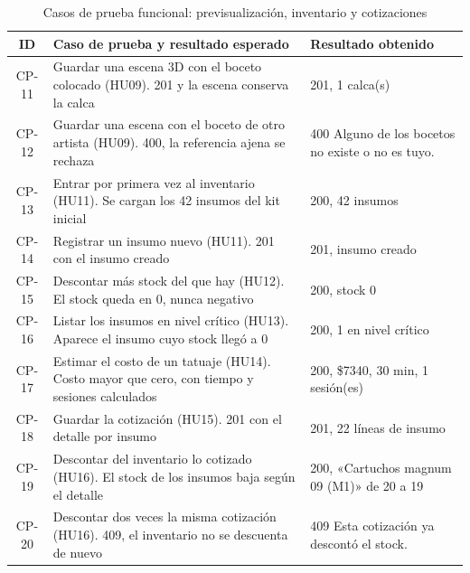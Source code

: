 \documentclass[12pt,letterpaper,oneside]{report}
\begin{document}
\begin{table}[H]
  \centering
  \caption{Casos de prueba funcional: previsualización, inventario y cotizaciones}
  \label{tab:casosinv}
  \renewcommand{\arraystretch}{1.2}
  \footnotesize
  \begin{tabular}{|c|p{5.9cm}|p{5.3cm}|}
    \hline
    \textbf{ID} & \textbf{Caso de prueba y resultado esperado} & \textbf{Resultado obtenido} \\
    \hline
    CP-11 & Guardar una escena 3D con el boceto colocado (HU09). 201 y la escena conserva la calca & 201, 1 calca(s) \\ \hline
    CP-12 & Guardar una escena con el boceto de otro artista (HU09). 400, la referencia ajena se rechaza & 400 Alguno de los bocetos no existe o no es tuyo. \\ \hline
    CP-13 & Entrar por primera vez al inventario (HU11). Se cargan los 42 insumos del kit inicial & 200, 42 insumos \\ \hline
    CP-14 & Registrar un insumo nuevo (HU11). 201 con el insumo creado & 201, insumo creado \\ \hline
    CP-15 & Descontar más stock del que hay (HU12). El stock queda en 0, nunca negativo & 200, stock 0 \\ \hline
    CP-16 & Listar los insumos en nivel crítico (HU13). Aparece el insumo cuyo stock llegó a 0 & 200, 1 en nivel crítico \\ \hline
    CP-17 & Estimar el costo de un tatuaje (HU14). Costo mayor que cero, con tiempo y sesiones calculados & 200, \$7340, 30 min, 1 sesión(es) \\ \hline
    CP-18 & Guardar la cotización (HU15). 201 con el detalle por insumo & 201, 22 líneas de insumo \\ \hline
    CP-19 & Descontar del inventario lo cotizado (HU16). El stock de los insumos baja según el detalle & 200, «Cartuchos magnum 09 (M1)» de 20 a 19 \\ \hline
    CP-20 & Descontar dos veces la misma cotización (HU16). 409, el inventario no se descuenta de nuevo & 409 Esta cotización ya descontó el stock. \\ \hline
  \end{tabular}
\end{table}
\end{document}
